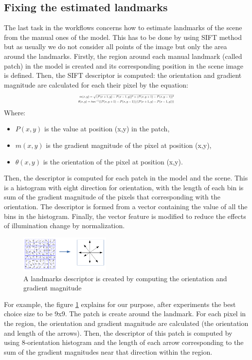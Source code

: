 \documentclass[twoside,twocolumn,10pt]{article}
\begin{document}
\subsection{Fixing the estimated landmarks}
The last task in the workflows concerns how to estimate landmarks of the scene from the manual ones of the model. This has to be done by using SIFT\cite{lowe2004distinctive} method but as usually we do not consider all points of the image but only the area around the landmarks. Firstly, the region around each manual landmark (called patch) in the model is created and its corresponding position in the scene image is defined. Then, the SIFT descriptor is computed: the orientation and gradient magnitude are calculated for each their pixel by the equation:
\begin{equation}
\label{eq:sift}
\resizebox{.41 \textwidth}{!} 
{$
\begin{aligned}
	m(x,y) = \sqrt{(P(x+1,y) - P(x-1,y))^2 + (P(x,y+1) - P(x,y-1))^2} \\
	\theta(x,y) = tan^{-1}((P(x,y+1) - P(x,y-1))/(P(x+1,y) - P(x-1,y)))
	\end{aligned}
$}
\end{equation}
Where:
\begin{itemize}
	\item $P(x,y)$ is the value at position (x,y) in the patch,
	\item $m(x,y)$ is the gradient magnitude of the pixel at position (x,y),
	\item $\theta(x,y)$ is the orientation of the pixel at position (x,y).
\end{itemize}
Then, the descriptor is computed for each patch in the model and the scene. This is a histogram with eight direction for orientation, with the length of each bin is sum of the gradient magnitude of the pixels that corresponding  with the orientation. The descriptor is formed from a vector containing the value of all the bins in the histogram. Finally, the vector feature is modified to reduce the effects of illumination change by normalization.

\begin{figure}[htb]
    \centering
    \includegraphics[width=0.4\textwidth]{./images/keypoint_descriptor}
    \caption{A landmarks descriptor is created by computing the orientation and gradient magnitude}
    \label{fig:kpdescriptor}
\end{figure}
For example, the figure \ref{fig:kpdescriptor} explains for our purpose, after experiments the best choice size to be 9x9. The patch is create around the landmark. For each pixel in the region, the orientation and gradient magnitude are calculated (the orientation and length of the arrows). 
Then, the descriptor of this patch is computed by using 8-orientation histogram and the length of each arrow corresponding to the sum of the gradient magnitudes near that direction within the region.\\
\end{document}

